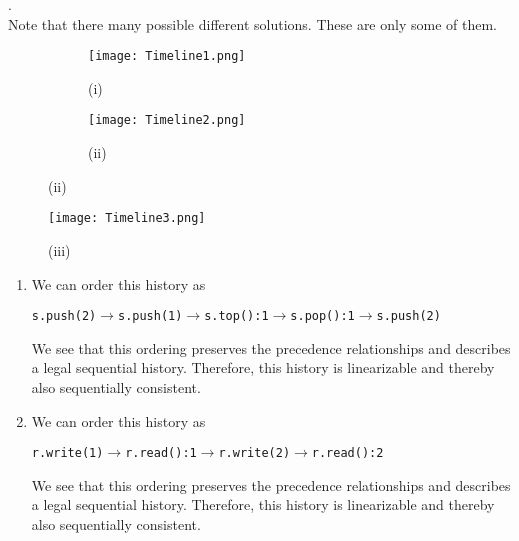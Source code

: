 \documentclass[main]{subfiles}
\begin{document}
\begin{ExerciseList}
        \Answer[ref={LSC}]. \\
            \Question Note that there many possible different solutions. These are only some of them. \\
                \begin{figure}[H]
                    \centering
                        \begin{subfigure}{.5\textwidth}
                        \texttt{[image: Timeline1.png]}
                        \captionsetup{labelformat=empty}
                        \caption{(i)}
                    \end{subfigure}%
                    \begin{subfigure}{.5\textwidth}
                        \centering
                        \texttt{[image: Timeline2.png]}
                        \captionsetup{labelformat=empty}
                        \caption{(ii)}
                    \end{subfigure}
                \end{figure}
                \begin{figure}[H]
                    \centering
                    \texttt{[image: Timeline3.png]}
                    \captionsetup{labelformat=empty}
                    \caption{(iii)}
                \end{figure}
            \Question
                \begin{enumerate}[label=(\roman*)]
                    \item We can order this history as
                        \begin{center}
                            \texttt{s.push(2)$\rightarrow$s.push(1)$\rightarrow$s.top():1$\rightarrow$s.pop():1$\rightarrow$s.push(2)}
                        \end{center}
                        We see that this ordering preserves the precedence relationships and describes a legal sequential history. Therefore, this history is linearizable and thereby also sequentially consistent.
                    \item We can order this history as
                        \begin{center}
                            \texttt{r.write(1)$\rightarrow$r.read():1$\rightarrow$r.write(2)$\rightarrow$r.read():2}
                        \end{center}
                        We see that this ordering preserves the precedence relationships and describes a legal sequential history. Therefore, this history is linearizable and thereby also sequentially consistent.

\end{enumerate}
\end{ExerciseList}
\end{document}
